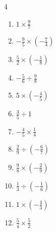 \begin{multicols}{4}
\begin{enumerate}
  \item $\displaystyle 1\times{}\frac{9}{7}$


  \item $\displaystyle -\frac{9}{5}\times{}\left(-\frac{7}{4}\right)$


  \item $\displaystyle \frac{5}{2}\times{}\left(-\frac{1}{8}\right)$


  \item $\displaystyle -\frac{5}{6}\div{}\frac{9}{8}$


  \item $\displaystyle 5\times{}\left(-\frac{4}{5}\right)$

        \phantom{$\displaystyle =-4$}

  \item $\displaystyle \frac{3}{5}\div{}1$


  \item $\displaystyle -\frac{4}{5}\times{}\frac{1}{4}$


  \item $\displaystyle \frac{2}{9}\div{}\left(-\frac{6}{7}\right)$


  \item $\displaystyle \frac{9}{8}\times{}\left(-\frac{2}{9}\right)$


  \item $\displaystyle \frac{1}{3}\div{}\left(-\frac{1}{6}\right)$

        \phantom{$\displaystyle =-2$}

\columnbreak %

  \item $\displaystyle 1\times{}\left(-\frac{4}{3}\right)$


  \item $\displaystyle \frac{5}{4}\times{}\frac{5}{2}$


\end{enumerate}
\end{multicols}
